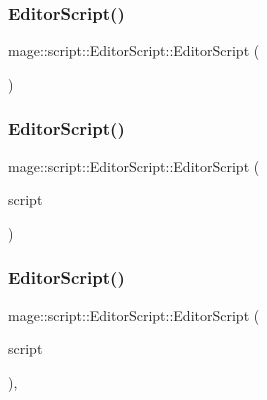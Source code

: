 \subsubsection{\texorpdfstring{Editor\+Script()}{EditorScript()}\hspace{0.1cm}{\footnotesize\ttfamily [1/3]}}
{\footnotesize\ttfamily mage\+::script\+::\+Editor\+Script\+::\+Editor\+Script (\begin{DoxyParamCaption}{ }\end{DoxyParamCaption})\hspace{0.3cm}{\ttfamily [default]}}

\hypertarget{classmage_1_1script_1_1_editor_script_a1db5b28c5f052f476173667572400998}{}\label{classmage_1_1script_1_1_editor_script_a1db5b28c5f052f476173667572400998} 
\subsubsection{\texorpdfstring{Editor\+Script()}{EditorScript()}\hspace{0.1cm}{\footnotesize\ttfamily [2/3]}}
{\footnotesize\ttfamily mage\+::script\+::\+Editor\+Script\+::\+Editor\+Script (\begin{DoxyParamCaption}\item[{const \hyperlink{classmage_1_1script_1_1_editor_script}{Editor\+Script} \&}]{script }\end{DoxyParamCaption})\hspace{0.3cm}{\ttfamily [default]}}

\hypertarget{classmage_1_1script_1_1_editor_script_ac7db9f4ad73fc58c371aaf754009404e}{}\label{classmage_1_1script_1_1_editor_script_ac7db9f4ad73fc58c371aaf754009404e} 
\subsubsection{\texorpdfstring{Editor\+Script()}{EditorScript()}\hspace{0.1cm}{\footnotesize\ttfamily [3/3]}}
{\footnotesize\ttfamily mage\+::script\+::\+Editor\+Script\+::\+Editor\+Script (\begin{DoxyParamCaption}\item[{\hyperlink{classmage_1_1script_1_1_editor_script}{Editor\+Script} \&\&}]{script }\end{DoxyParamCaption})\hspace{0.3cm}{\ttfamily [default]}, {\ttfamily [noexcept]}}

